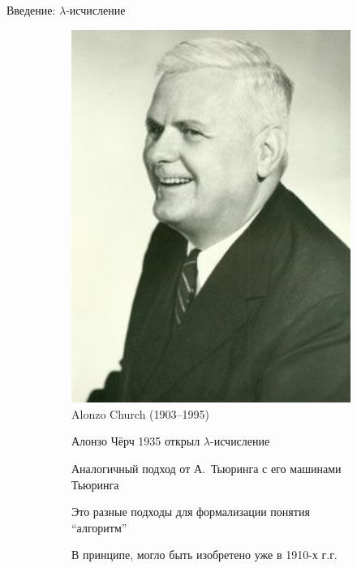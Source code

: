 

\begin{frame}{Введение: $\lambda$-исчисление}
  \begin{figure}
    \centering
    \begin{subfigure}[t]{0.45\textwidth}
      \begin{minipage}{0.7\textwidth}
      \includegraphics[width=1\textwidth]{220px-Alonzo_Church.jpg}\\
            Alonzo Church (1903--1995)
      \end{minipage}
    \end{subfigure}
    \begin{subfigure}[t]{0.45\textwidth}
      \vspace{-5em}   %
  Алонзо Чёрч 1935   открыл $\lambda$-исчисление
\vspace{1em}

Аналогичный подход от А.~Тьюринга с его машинами Тьюринга
\vspace{1em}

Это разные подходы для формализации понятия ``алгоритм''
\vspace{1em}

В принципе, могло быть изобретено уже в 1910-х г.г.

    \end{subfigure}
  \end{figure}

\end{frame}
